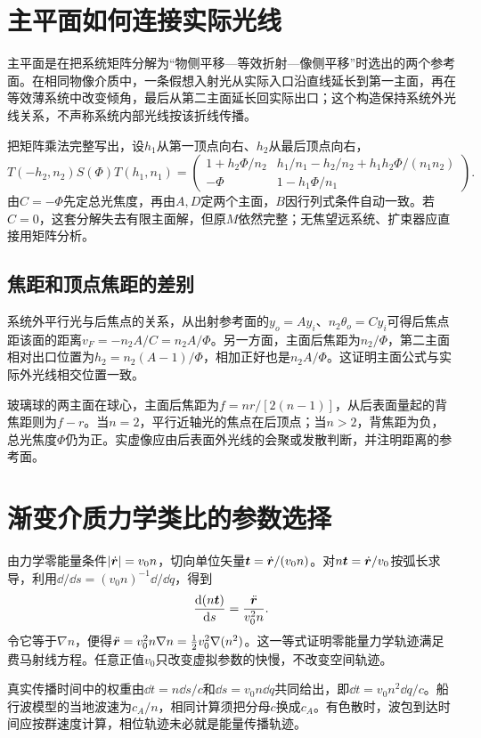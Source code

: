\section{主平面如何连接实际光线}
主平面是在把系统矩阵分解为“物侧平移—等效折射—像侧平移”时选出的两个参考面。在相同物像介质中，一条假想入射光从实际入口沿直线延长到第一主面，再在等效薄系统中改变倾角，最后从第二主面延长回实际出口；这个构造保持系统外光线关系，不声称系统内部光线按该折线传播。

把矩阵乘法完整写出，设$h_1$从第一顶点向右、$h_2$从最后顶点向右，
\[
 T(-h_2,n_2)S(\Phi)T(h_1,n_1)
 =\begin{pmatrix}
 1+h_2\Phi/n_2&h_1/n_1-h_2/n_2+h_1h_2\Phi/(n_1n_2)\\
 -\Phi&1-h_1\Phi/n_1
 \end{pmatrix}.
\]
由$C=-\Phi$先定总光焦度，再由$A,D$定两个主面，$B$因行列式条件自动一致。若$C=0$，这套分解失去有限主面解，但原$M$依然完整；无焦望远系统、扩束器应直接用矩阵分析。

\subsection{焦距和顶点焦距的差别}
系统外平行光与后焦点的关系，从出射参考面的$y_o=Ay_i$、$n_2\theta_o=Cy_i$可得后焦点距该面的距离$v_F=-n_2A/C=n_2A/\Phi$。另一方面，主面后焦距为$n_2/\Phi$，第二主面相对出口位置为$h_2=n_2(A-1)/\Phi$，相加正好也是$n_2A/\Phi$。这证明主面公式与实际外光线相交位置一致。

玻璃球的两主面在球心，主面后焦距为$f=nr/[2(n-1)]$，从后表面量起的背焦距则为$f-r$。当$n=2$，平行近轴光的焦点在后顶点；当$n>2$，背焦距为负，总光焦度$\Phi$仍为正。实虚像应由后表面外光线的会聚或发散判断，并注明距离的参考面。

\section{渐变介质力学类比的参数选择}
由力学零能量条件$|\dot{\bm{r}}|=v_0n$，切向单位矢量$\bm{t}=\dot{\bm{r}}/(v_0n)$。对$n\bm{t}=\dot{\bm{r}}/v_0$按弧长求导，利用$\dd/\dd s=(v_0n)^{-1}\dd/\dd q$，得到
\[
 \frac{\mathop{}\!\mathrm d(n\bm{t})}{\mathop{}\!\mathrm d s}
 =\frac{\ddot{\bm{r}}}{v_0^2n}.
\]
令它等于$\nabla n$，便得$\ddot{\bm{r}}=v_0^2n\nabla n=\tfrac12v_0^2\nabla(n^2)$。这一等式证明零能量力学轨迹满足费马射线方程。任意正值$v_0$只改变虚拟参数的快慢，不改变空间轨迹。

真实传播时间中的权重由$\dd t=n\dd s/c$和$\dd s=v_0n\dd q$共同给出，即$\dd t=v_0n^2\dd q/c$。船行波模型的当地波速为$c_A/n$，相同计算须把分母$c$换成$c_A$。有色散时，波包到达时间应按群速度计算，相位轨迹未必就是能量传播轨迹。

